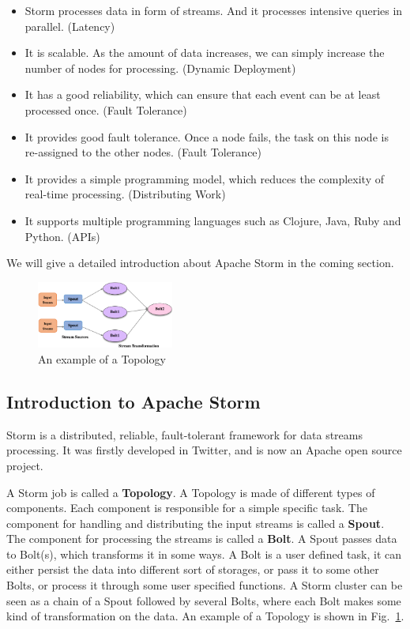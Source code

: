 \documentclass[	DIV=calc,%
							paper=a4,%
							fontsize=11pt,%
							twocolumn]{scrartcl}	 					%
\begin{document}
\begin{itemize}

\item Storm processes data in form of streams. And it processes intensive queries in parallel. (Latency)

\item It is scalable. As the amount of data increases, we can simply increase the number of nodes for processing. (Dynamic Deployment) 

\item It has a good reliability, which can ensure that each event can be at least processed once. (Fault Tolerance)

\item It provides good fault tolerance. Once a node fails, the task on this node is re-assigned to the other nodes. (Fault Tolerance)

\item It provides a simple programming model, which reduces the complexity of real-time processing. (Distributing Work)

\item It supports multiple programming languages such as Clojure, Java, Ruby and Python. (APIs)

\end{itemize}

We will give a detailed introduction about Apache Storm in the coming section.

\begin{figure}
  \centering
    \includegraphics[width=0.4\textwidth]{images/topology.png}
    \caption{An example of a Topology}
    \label{fig:topology}   
\end{figure}


\subsection*{Introduction to Apache Storm}

Storm is a distributed, reliable, fault-tolerant framework for data streams processing. It was firstly developed in Twitter, and is now an Apache open source project.

A Storm job is called a \textbf{Topology}. A Topology is made of different types of components. Each component is responsible for a simple specific task. The component for handling and distributing the input streams is called a \textbf{Spout}. The component for processing the streams is called a \textbf{Bolt}. A Spout passes data to Bolt(s), which transforms it in some ways. A Bolt is a user defined task, it can either persist the data into different sort of storages, or pass it to some other Bolts, or process it through some user specified functions. A Storm cluster can be seen as a chain of a Spout followed by several Bolts, where each Bolt makes some kind of transformation on the data. An example of a Topology is shown in Fig.~\ref{fig:topology}.
\end{document}
